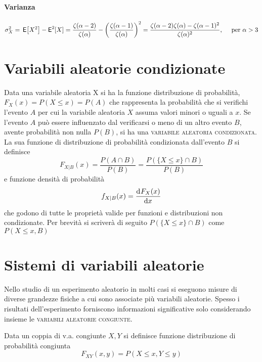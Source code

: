 \paragraph{Varianza}
\begin{equation}
	\sigma_X^2 = \,{\operatorname{\mathsf{E}}}\!\left[{X^2}\right] - \operatorname{\mathsf{E}}^2[X] =
	\frac{\zeta(\alpha -2)}{\zeta(\alpha)} - \left(\frac{\zeta(\alpha-1)}{\zeta(\alpha)}\right)^2 =
	\frac{\zeta(\alpha-2)\zeta(\alpha) - \zeta(\alpha-1)^2}{\zeta(\alpha)^2},
	\quad \text{ per } \alpha > 3
\end{equation}

\section{Variabili aleatorie condizionate}
Data una variabile aleatoria X si ha la funzione distribuzione di probabilità, $F_X(x)=P(X\leq x)=P(A)$ che rappresenta la probabilità che si verifichi l'evento $A$ per cui la variabile aleatoria $X$ assuma valori minori o uguali a $x$.
Se l'evento $A$ può essere influenzato dal verificarsi o meno di un altro evento $B$, avente probabilità non nulla $P(B)$, si ha una \textsc{variabile aleatoria condizionata}.
La sua funzione di distribuzione di probabilità condizionata dall'evento $B$ si definisce
\begin{equation}
F_{X|B}(x)=\frac{P(A\cap B)}{P(B)}=\frac{P(\lbrace X\leq x\rbrace\cap B)}{P(B)}
\end{equation}
e funzione densità di probabilità
\[f_{X|B}(x)=\dfrac{\mathop{}\!\mathrm{d}^{}F_X(x)}{\mathop{}\!\mathrm{d} x^{}}\]
che godono di tutte le proprietà valide per funzioni e distribuzioni non condizionate.
Per brevità si scriverà di seguito $P(\lbrace X\leq x\rbrace\cap B)$ come $P(X\leq x, B)$

\section{Sistemi di variabili aleatorie}
Nello studio di un esperimento aleatorio in molti casi si eseguono misure di diverse grandezze fisiche a cui sono associate più variabili aleatorie. Spesso i risultati dell'esperimento forniscono informazioni significative solo considerando insieme le \textsc{variabili aleatorie congiunte}.

Data un coppia di v.a. congiunte $X,Y$ si definisce funzione distribuzione di probabilità congiunta
\begin{equation}
F_{XY}(x,y)=P(X\leq x,Y\leq y)
\end{equation}\label{eq:funz_dist_prob_congiunta}

